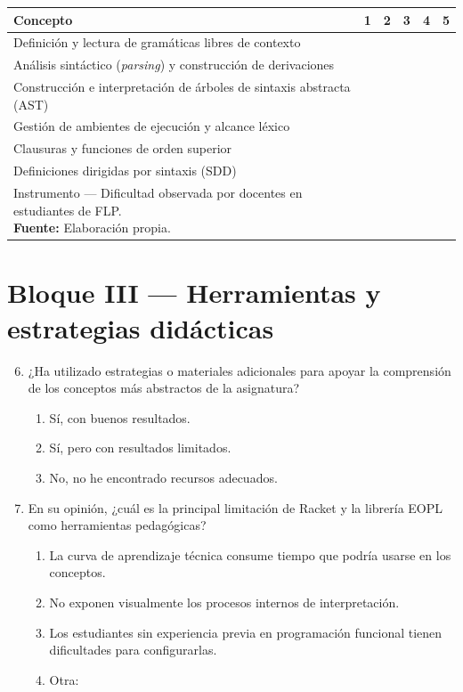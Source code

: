 \begin{enumerate}
    \begin{longtable}{|p{9cm}|p{0.5cm}|p{0.5cm}|p{0.5cm}|p{0.5cm}|p{0.5cm}|}
        \hline
        \textbf{Concepto} & \textbf{1} & \textbf{2} & \textbf{3} & \textbf{4} & \textbf{5} \\
        \hline
        Definición y lectura de gramáticas libres de contexto & & & & & \\ \hline
        Análisis sintáctico (\textit{parsing}) y construcción de derivaciones & & & & & \\ \hline
        Construcción e interpretación de árboles de sintaxis abstracta (AST) & & & & & \\ \hline
        Gestión de ambientes de ejecución y alcance léxico & & & & & \\ \hline
        Clausuras y funciones de orden superior & & & & & \\ \hline
        Definiciones dirigidas por sintaxis (SDD) & & & & & \\ \hline
        \caption{Instrumento — Dificultad observada por docentes en estudiantes de FLP.\\
        \scriptsize \textbf{Fuente:} Elaboración propia.}
        \label{tab:instrumento-docentes}
    \end{longtable}
\end{enumerate}

\section*{Bloque III — Herramientas y estrategias didácticas}

\begin{enumerate}
    \setcounter{enumi}{5}

    \item ¿Ha utilizado estrategias o materiales adicionales para apoyar la comprensión de los conceptos más abstractos de la asignatura?
    \begin{enumerate}
        \item Sí, con buenos resultados.
        \item Sí, pero con resultados limitados.
        \item No, no he encontrado recursos adecuados.
    \end{enumerate}

    \item En su opinión, ¿cuál es la principal limitación de Racket y la librería EOPL como herramientas pedagógicas?
    \begin{enumerate}
        \item La curva de aprendizaje técnica consume tiempo que podría usarse en los conceptos.
        \item No exponen visualmente los procesos internos de interpretación.
        \item Los estudiantes sin experiencia previa en programación funcional tienen dificultades para configurarlas.
        \item Otra: \underline{\hspace{6cm}}
    \end{enumerate}
\end{enumerate}

